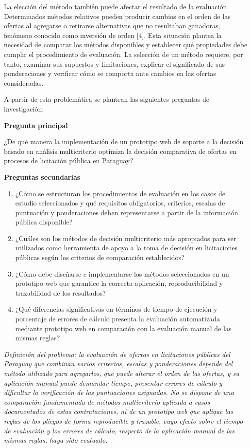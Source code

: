 \documentclass[12pt,a4paper]{article}
\begin{document}
La elección del método también puede afectar el resultado de la evaluación. Determinados métodos relativos pueden producir cambios en el orden de las ofertas al agregarse o retirarse alternativas que no resultaban ganadoras, fenómeno conocido como inversión de orden [4]. Esta situación plantea la necesidad de comparar los métodos disponibles y establecer qué propiedades debe cumplir el procedimiento de evaluación. La selección de un método requiere, por tanto, examinar sus supuestos y limitaciones, explicar el significado de sus ponderaciones y verificar cómo se comporta ante cambios en las ofertas consideradas.

A partir de esta problemática se plantean las siguientes preguntas de investigación:

\textbf{Pregunta principal}

¿De qué manera la implementación de un prototipo web de soporte a la decisión basado en análisis multicriterio optimiza la decisión comparativa de ofertas en procesos de licitación pública en Paraguay?

\textbf{Preguntas secundarias}

\begin{enumerate}
\item ¿Cómo se estructuran los procedimientos de evaluación en los casos de estudio seleccionados y qué requisitos obligatorios, criterios, escalas de puntuación y ponderaciones deben representarse a partir de la información pública disponible?
\item ¿Cuáles son los métodos de decisión multicriterio más apropiados para ser utilizados como herramienta de apoyo a la toma de decisión en licitaciones públicas según los criterios de comparación establecidos?
\item ¿Cómo debe diseñarse e implementarse los métodos seleccionados en un prototipo web que garantice la correcta aplicación, reproducibilidad y trazabilidad de los resultados?
\item ¿Qué diferencias significativas en términos de tiempo de ejecución y porcentaje de errores de cálculo presenta la evaluación automatizada mediante prototipo web en comparación con la evaluación manual de las mismas reglas?
\end{enumerate}


\textit{Definición del problema: la evaluación de ofertas en licitaciones públicas del Paraguay que combinan varios criterios, escalas y ponderaciones depende del método utilizado para agregarlos, que puede alterar el orden de las ofertas, y su aplicación manual puede demandar tiempo, presentar errores de cálculo y dificultar la verificación de las puntuaciones asignadas. No se dispone de una comparación fundamentada de métodos multicriterio aplicada a casos documentados de estas contrataciones, ni de un prototipo web que aplique las reglas de los pliegos de forma reproducible y trazable, cuyo efecto sobre el tiempo de evaluación y los errores de cálculo, respecto de la aplicación manual de las mismas reglas, haya sido evaluado.}
\end{document}
